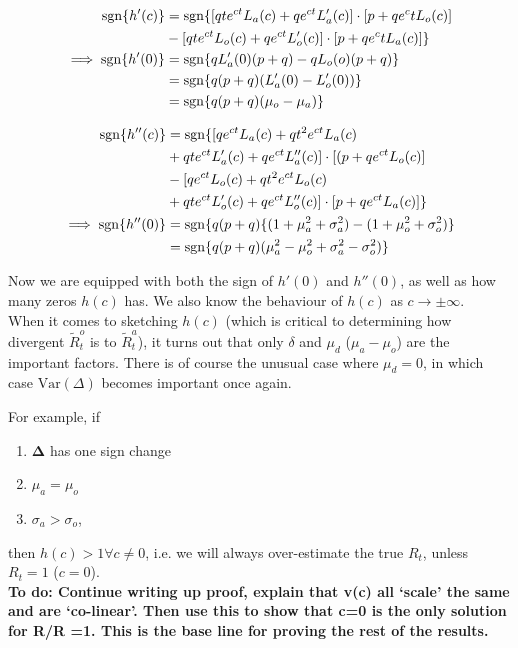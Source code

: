 \documentclass[10pt,journal,compsoc]{IEEEtran}
\begin{document}
\begin{align*}
\mathrm{sgn} \{ h'(c)\} &= \mathrm{sgn} \{\Large[qte^{ct}L_a(c) +qe^{ct}L_a'(c)\Large] \cdot \Large[ p+q e^ct L_o(c) \Large] \\ 
&- \Large[qte^{ct}L_o(c) +qe^{ct}L_o'(c)\Large] \cdot \Large[ p+q e^ct L_a(c) \Large] \}\\
\implies \mathrm{sgn} \{ h'(0)\}&= \mathrm{sgn} \{qL_a'(0)(p+q)-qL_o(o)(p+q) \}\\
&= \mathrm{sgn} \{ q(p+q)\Large( L_a'(0) - L_o'(0)\Large) \}\\
&= \mathrm{sgn} \{ q(p+q)(\mu_o-\mu_a) \}
\end{align*}

\begin{equation*}
\begin{split}
\mathrm{sgn} \{ h''(c)\} &= \mathrm{sgn} \{\Large[ qe^{ct}L_a(c)+qt^2e^{ct}L_a(c)\\
&+ qte^{ct}L_a'(c)+qe^{ct}L_a''(c) \Large] \cdot \Large[(p+qe^{ct}L_o(c) \Large]\\ 
&- \Large[ qe^{ct}L_o(c)+qt^2e^{ct}L_o(c)\\
&+ qte^{ct}L_o'(c)+qe^{ct}L_o''(c) \Large] \cdot \Large[p+qe^{ct}L_a(c) \Large] \} \\
\implies \mathrm{sgn} \{ h''(0)\}&= \mathrm{sgn} \{q(p+q)\{ \Large(1+ \mu_a^2 +\sigma_a^2 \Large) - \Large( 1+ \mu_o^2 +\sigma_o^2 \Large) \}\\
&= \mathrm{sgn} \{q(p+q)(\mu^2_a-\mu_o^2 + \sigma_a^2 -\sigma_o^2) \}
\end{split}
\end{equation*}

Now we are equipped with both the sign of $h'(0)$ and $h''(0)$, as well as how many zeros $h(c)$ has. We also know the behaviour of $h(c)$ as $c \rightarrow \pm \infty$.\\
When it comes to sketching $h(c)$ (which is critical to determining how divergent $\tilde{R}_t^o$ is to $\tilde{R}_t^a$), it turns out that only $\delta$ and $\mu_d$ ($\mu_a- \mu_o$) are the important factors. There is of course the unusual case where $\mu_d=0$, in which case $\mathrm{Var}(\Delta)$ becomes important once again.

For example, if 
\begin{enumerate}
    \item $\boldsymbol{\Delta}$ has one sign change
    \item $\mu_a =\mu_o$
    \item $\sigma_a > \sigma_o$,
\end{enumerate}
then $h(c)>1 \forall c \ne 0$, i.e. we will always over-estimate the true $R_t$, unless $R_t = 1$ ($c=0$).\\
\textbf{To do: Continue writing up proof, explain that v(c) all `scale' the same and are `co-linear'. Then use this to show that c=0 is the only solution for R/R =1. This is the base line for proving the rest of the results.}
\end{document}
